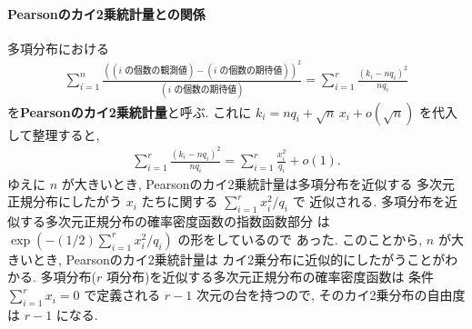 \documentclass[12pt,twoside]{jarticle}
\theoremstyle{jplain}
\theoremstyle{jplain}
\theoremstyle{jplain}
\numberwithin{theorem}{section}
\numberwithin{equation}{section}
\numberwithin{figure}{section}
\numberwithin{table}{section}
\begin{document}
\paragraph{Pearsonのカイ2乗統計量との関係}
多項分布における
\begin{align*}
\sum_{i=1}^n
\frac
{((\text{$i$ の個数の観測値})-(\text{$i$ の個数の期待値}))^2}
{(\text{$i$ の個数の期待値})}
=\sum_{i=1}^r \frac{(k_i-nq_i)^2}{nq_i}
\end{align*}
を{\bf Pearsonのカイ2乗統計量}と呼ぶ. 
これに $k_i=nq_i+\sqrt{n}\,x_i+o(\sqrt{n})$ を代入して整理すると, 
\begin{align*}
\sum_{i=1}^r \frac{(k_i-nq_i)^2}{nq_i}
=\sum_{i=1}^r \frac{x_i^2}{q_i} + o(1).
\end{align*}
ゆえに $n$ が大きいとき, Pearsonのカイ2乗統計量は多項分布を近似する
多次元正規分布にしたがう $x_i$ たちに関する $\sum_{i=1}^r x_i^2/q_i$ で
近似される. 多項分布を近似する多次元正規分布の確率密度函数の指数函数部分
は $\exp\left(-(1/2)\sum_{i=1}^r x_i^2/q_i\right)$ の形をしているので
あった. このことから, $n$ が大きいとき, Pearsonのカイ2乗統計量は
カイ2乗分布に近似的にしたがうことがわかる.
多項分布($r$ 項分布)を近似する多次元正規分布の確率密度函数は 
条件 $\sum_{i=1}^r x_i=0$ で定義される $r-1$ 次元の台を持つので, 
そのカイ2乗分布の自由度は $r-1$ になる. 
\end{document}
